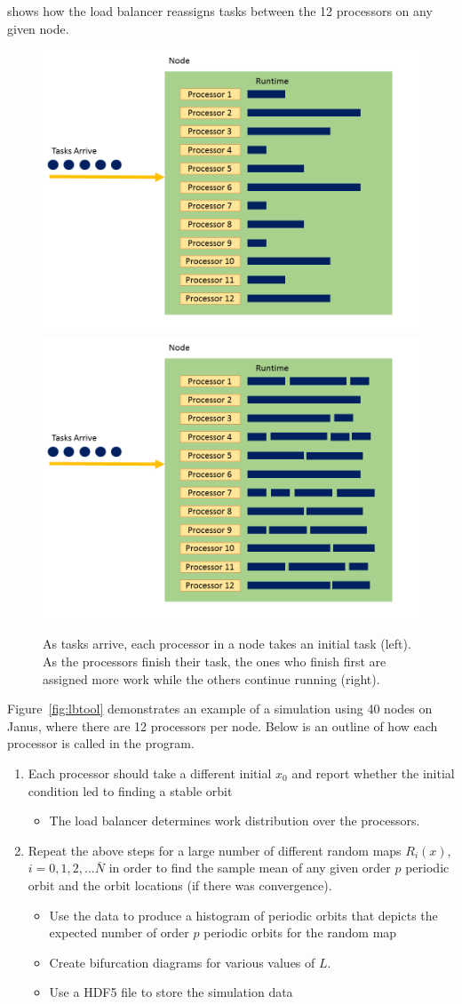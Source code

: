 shows how the load balancer reassigns tasks between the 12 processors
on any given node.
\begin{figure}[htp]
\caption[Processor work distribution before and after load
balancing]{As tasks arrive, each processor in a node takes an initial
  task (left). As the processors finish their task, the ones who finish first are
assigned more work while the others continue running (right).}\label{fig:loadbalance_node}
\centering
\includegraphics[width=.5\textwidth]{figs/loadbalance_node_start.png}\hfill
\includegraphics[width=.5\textwidth]{figs/loadbalance_node_end.png}
\end{figure}
Figure~\ref{fig:lbtool} demonstrates an example of a simulation
using 40 nodes on Janus, where there are 12 processors per
node. Below is an outline of how each processor is called in the program. 
\begin{enumerate}
\item Each processor should take a different initial $x_0$ and report
  whether the initial condition led to finding a stable orbit  
\begin{itemize}
\item The load balancer determines work distribution over the processors.
\end{itemize}
\item Repeat the above steps for a large number of different random
  maps $R_i(x)$, $i = 0, 1, 2,... \bar{N}$ in order to find the sample
  mean of any given order $p$ periodic orbit and the orbit locations
  (if there was convergence).
\begin{itemize}
\item Use the data to produce a histogram of periodic orbits that depicts the expected number of order $p$ periodic orbits for the random map
\item Create bifurcation diagrams for various values of $L$.
\item Use a HDF5 file to store the simulation data
\end{itemize}
\end{enumerate}

